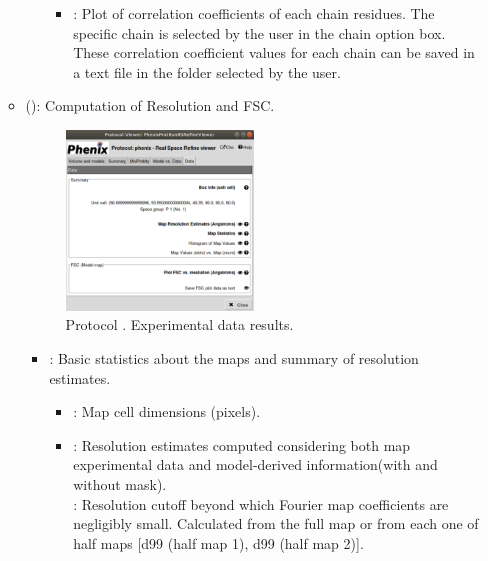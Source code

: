 \begin{itemize}
\begin{itemize}
\begin{itemize}
\begin{itemize}
           \item {}: Plot of correlation coefficients of each chain residues. The specific chain is selected by the user in the chain option box. These correlation coefficient values for each chain can be saved in a text file in the folder selected by the user.
         \end{itemize}
        \end{itemize}
      \item {} (): Computation of Resolution  and FSC.
       \begin{figure}[H]
         \centering 
         \captionsetup{width=.0\linewidth} 
         \includegraphics[width=0.50\textwidth]{Images_appendix/Fig152.pdf}
         \caption{Protocol . Experimental data results.}
         \label{fig:app_protocol_real_space_refine_5}
        \end{figure}
        \begin{itemize}
         \item {}: Basic statistics about the maps and summary of resolution estimates.
         \begin{itemize}
          \item {}: Map cell dimensions (pixels).
          \item {}: Resolution estimates computed considering both map experimental data and model-derived information(with and without mask)\setlength{\parindent}{12pt}.\\
            : Resolution cutoff beyond which Fourier map coefficients are negligibly small. Calculated from the full map or from each one of half maps [d99 (half map 1), d99 (half map 2)].\\

\end{itemize}
\end{itemize}
\end{itemize}
\end{itemize}
